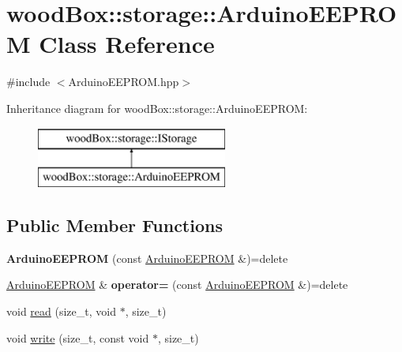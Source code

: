 \hypertarget{classwood_box_1_1storage_1_1_arduino_e_e_p_r_o_m}{}\section{wood\+Box\+:\+:storage\+:\+:Arduino\+E\+E\+P\+R\+OM Class Reference}
\label{classwood_box_1_1storage_1_1_arduino_e_e_p_r_o_m}


{\ttfamily \#include $<$Arduino\+E\+E\+P\+R\+O\+M.\+hpp$>$}

Inheritance diagram for wood\+Box\+:\+:storage\+:\+:Arduino\+E\+E\+P\+R\+OM\+:\begin{figure}[H]
\begin{center}
\leavevmode
\includegraphics[height=2.000000cm]{classwood_box_1_1storage_1_1_arduino_e_e_p_r_o_m}
\end{center}
\end{figure}
\subsection*{Public Member Functions}
\begin{DoxyCompactItemize}
\item 
\mbox{\label{classwood_box_1_1storage_1_1_arduino_e_e_p_r_o_m_aef3abecbf1f622d59dca7d3130292670}} 
{\bfseries Arduino\+E\+E\+P\+R\+OM} (const \mbox{\hyperlink{classwood_box_1_1storage_1_1_arduino_e_e_p_r_o_m}{Arduino\+E\+E\+P\+R\+OM}} \&)=delete
\item 
\mbox{\label{classwood_box_1_1storage_1_1_arduino_e_e_p_r_o_m_a873dd773954d6813bc5b8005ef2405e3}} 
\mbox{\hyperlink{classwood_box_1_1storage_1_1_arduino_e_e_p_r_o_m}{Arduino\+E\+E\+P\+R\+OM}} \& {\bfseries operator=} (const \mbox{\hyperlink{classwood_box_1_1storage_1_1_arduino_e_e_p_r_o_m}{Arduino\+E\+E\+P\+R\+OM}} \&)=delete
\item 
void \mbox{\hyperlink{classwood_box_1_1storage_1_1_arduino_e_e_p_r_o_m_a1b9deb25ea803456b5450f4e3782fd20}{read}} (size\+\_\+t, void $\ast$, size\+\_\+t)
\item 
void \mbox{\hyperlink{classwood_box_1_1storage_1_1_arduino_e_e_p_r_o_m_af78d2077806af7e1aac65d6890915d77}{write}} (size\+\_\+t, const void $\ast$, size\+\_\+t)
\end{DoxyCompactItemize}


